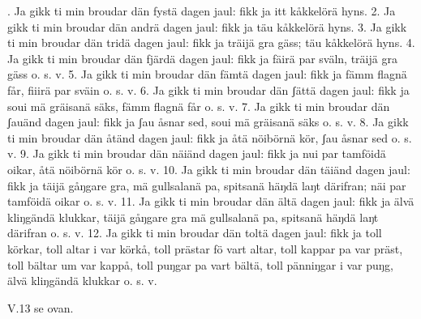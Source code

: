 .  Ja gikk ti min broudar dän fystä dagen jaul:
    fikk ja itt kåkkelörä hyns.
2.  Ja gikk ti min broudar dän andrä dagen jaul:
    fikk ja täu kåkkelörä hyns.
3.  Ja gikk ti min broudar dän tridä dagen jaul:
    fikk ja träijä gra gäss;
    täu kåkkelörä hyns.
4.  Ja gikk ti min broudar dän fjärdä dagen jaul:
    fikk ja fäirä par sväln,
    träijä gra gäss o. s. v.
5.  Ja gikk ti min broudar dän fämtä dagen jaul:
    fikk ja fämm flagnä får,
    fiiirä par sväin o. s. v.
6.  Ja gikk ti min broudar dän ʃättä dagen jaul:
    fikk ja soui mä gräisanä säks,
    fämm flagnä får o. s. v.
7.  Ja gikk ti min broudar dän ʃauänd dagen jaul:
    fikk ja ʃau åsnar sed,
    soui mä gräisanä säks o. s. v.
8.  Ja gikk ti min broudar dän åtänd dagen jaul:
    fikk ja åtä nöibörnä kör,
    ʃau åsnar sed o. s. v.
9.  Ja gikk ti min broudar dän näiänd dagen jaul:
    fikk ja nui par tamföidä oikar,
    åtä nöibörnä kör o. s. v.
10. Ja gikk ti min broudar dän täiänd dagen jaul:
    fikk ja täijä gåŋgare gra,
    mä gullsalanä pa,
    spitsanä häŋdä laŋt därifran;
    näi par tamföidä oikar o. s. v.
11. Ja gikk ti min broudar dän ältä dagen jaul:
    fikk ja älvä kliŋgändä klukkar,
    täijä gåŋgare gra
    mä gullsalanä pa,
    spitsanä häŋdä laŋt därifran o. s. v.
12. Ja gikk ti min broudar dän toltä dagen jaul:
    fikk ja toll körkar,
    toll altar i var körkå,
    toll prästar fö vart altar,
    toll kappar pa var präst,
    toll bältar um var kappå,
    toll puŋgar pa vart bältä,
    toll pänniŋgar i var puŋg,
    älvä kliŋgändä klukkar o. s. v.
    
\vspace{5mm}
\tabto{0.2cm} V.\@ 13 se ovan.
